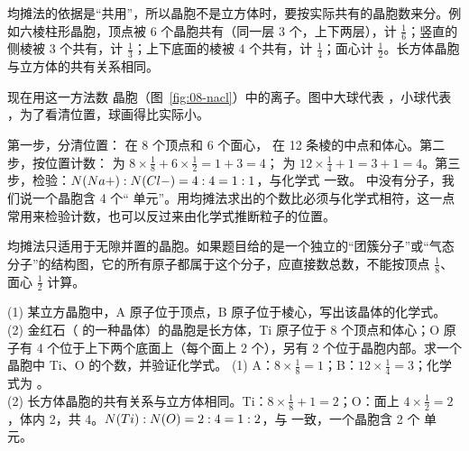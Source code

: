 均摊法的依据是“共用”，所以晶胞不是立方体时，要按实际共有的晶胞数来分。例如六棱柱形晶胞，顶点被 6 个晶胞共有（同一层 3 个，上下两层），计 $\frac16$；竖直的侧棱被 3 个共有，计 $\frac13$；上下底面的棱被 4 个共有，计 $\frac14$；面心计 $\frac12$。长方体晶胞与立方体的共有关系相同。

现在用这一方法数  晶胞（图~\ref{fig:08-nacl}）中的离子。图中大球代表 ，小球代表 ，为了看清位置，球画得比实际小。


第一步，分清位置： 在 8 个顶点和 6 个面心， 在 12 条棱的中点和体心。第二步，按位置计数： 为 $8\times\frac18+6\times\frac12=1+3=4$； 为 $12\times\frac14+1=3+1=4$。第三步，检验：$N(Na+):N(Cl-)=4:4=1:1$，与化学式  一致。 中没有分子，我们说一个晶胞含 4 个“ 单元”。用均摊法求出的个数比必须与化学式相符，这一点常用来检验计数，也可以反过来由化学式推断粒子的位置。

\begin{yicuo}
均摊法只适用于无隙并置的晶胞。如果题目给的是一个独立的“团簇分子”或“气态分子”的结构图，它的所有原子都属于这个分子，应直接数总数，不能按顶点 $\frac18$、面心 $\frac12$ 计算。
\end{yicuo}

\begin{liti}[基础→典型]
(1) 某立方晶胞中，A 原子位于顶点，B 原子位于棱心，写出该晶体的化学式。(2) 金红石（ 的一种晶体）的晶胞是长方体，Ti 原子位于 8 个顶点和体心；O 原子有 4 个位于上下两个底面上（每个面上 2 个），另有 2 个位于晶胞内部。求一个晶胞中 Ti、O 的个数，并验证化学式。
\tcblower
\jie (1) A：$8\times\frac18=1$；B：$12\times\frac14=3$；化学式为 。\\
(2) 长方体晶胞的共有关系与立方体相同。Ti：$8\times\frac18+1=2$；O：面上 $4\times\frac12=2$，体内 2，共 4。$N(Ti):N(O)=2:4=1:2$，与  一致，一个晶胞含 2 个  单元。
\end{liti}

